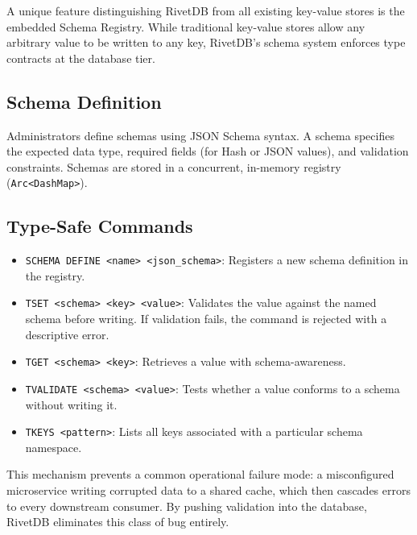 A unique feature distinguishing RivetDB from all existing key-value stores is the embedded Schema Registry. While traditional key-value stores allow any arbitrary value to be written to any key, RivetDB's schema system enforces type contracts at the database tier.

\subsection{Schema Definition}
Administrators define schemas using JSON Schema syntax. A schema specifies the expected data type, required fields (for Hash or JSON values), and validation constraints. Schemas are stored in a concurrent, in-memory registry (\texttt{Arc<DashMap>}).

\subsection{Type-Safe Commands}
\begin{itemize}[leftmargin=2.5em]
    \item \texttt{SCHEMA DEFINE <name> <json\_schema>}: Registers a new schema definition in the registry.
    \item \texttt{TSET <schema> <key> <value>}: Validates the value against the named schema before writing. If validation fails, the command is rejected with a descriptive error.
    \item \texttt{TGET <schema> <key>}: Retrieves a value with schema-awareness.
    \item \texttt{TVALIDATE <schema> <value>}: Tests whether a value conforms to a schema without writing it.
    \item \texttt{TKEYS <pattern>}: Lists all keys associated with a particular schema namespace.
\end{itemize}

This mechanism prevents a common operational failure mode: a misconfigured microservice writing corrupted data to a shared cache, which then cascades errors to every downstream consumer. By pushing validation into the database, RivetDB eliminates this class of bug entirely.

